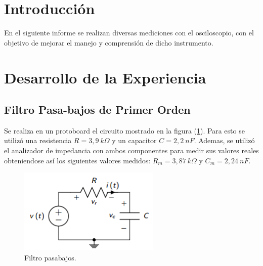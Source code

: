\documentclass[a4paper]{article}
\begin{document}









\section*{Introducción}

En el siguiente informe se realizan diversas mediciones con el osciloscopio, con el objetivo de mejorar el manejo y comprensión de dicho instrumento.

\section*{Desarrollo de la Experiencia}

\subsection*{Filtro Pasa-bajos de Primer Orden}

Se realiza en un protoboard el circuito mostrado en la figura (\ref{graf:pasabajos}). Para esto se utilizó una resistencia $ R = 3,9 \ k\Omega $ y un capacitor $ C = 2,2 \ nF $. Ademas, se utilizó el analizador de impedancia con ambos componentes para medir sus valores reales obteniendose así los siguientes valores medidos: $ R_{m} = 3,87 \ k\Omega $ y $ C_{m} = 2,24 \ nF $.

\begin{figure}[H]
	\centering
	\includegraphics[width=0.6\textwidth]{Filtro-pasabajos.PNG}
	\caption{Filtro pasabajos.} 
	\label{graf:pasabajos}
\end{figure}
\end{document}
